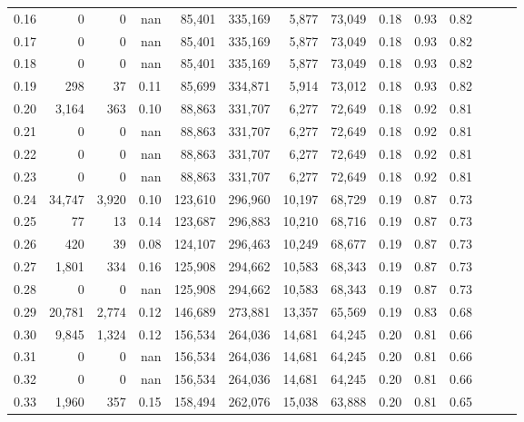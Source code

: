 \begin{tabular}{rrrrrrrrrrrrrr}
0.16 &       0 &      0 &   nan &   85,401 &  335,169 &   5,877 &  73,049 &  0.18 &  0.93 &      0.82 \\
0.17 &       0 &      0 &   nan &   85,401 &  335,169 &   5,877 &  73,049 &  0.18 &  0.93 &      0.82 \\
0.18 &       0 &      0 &   nan &   85,401 &  335,169 &   5,877 &  73,049 &  0.18 &  0.93 &      0.82 \\
0.19 &     298 &     37 &  0.11 &   85,699 &  334,871 &   5,914 &  73,012 &  0.18 &  0.93 &      0.82 \\
0.20 &   3,164 &    363 &  0.10 &   88,863 &  331,707 &   6,277 &  72,649 &  0.18 &  0.92 &      0.81 \\
0.21 &       0 &      0 &   nan &   88,863 &  331,707 &   6,277 &  72,649 &  0.18 &  0.92 &      0.81 \\
0.22 &       0 &      0 &   nan &   88,863 &  331,707 &   6,277 &  72,649 &  0.18 &  0.92 &      0.81 \\
0.23 &       0 &      0 &   nan &   88,863 &  331,707 &   6,277 &  72,649 &  0.18 &  0.92 &      0.81 \\
0.24 &  34,747 &  3,920 &  0.10 &  123,610 &  296,960 &  10,197 &  68,729 &  0.19 &  0.87 &      0.73 \\
0.25 &      77 &     13 &  0.14 &  123,687 &  296,883 &  10,210 &  68,716 &  0.19 &  0.87 &      0.73 \\
0.26 &     420 &     39 &  0.08 &  124,107 &  296,463 &  10,249 &  68,677 &  0.19 &  0.87 &      0.73 \\
0.27 &   1,801 &    334 &  0.16 &  125,908 &  294,662 &  10,583 &  68,343 &  0.19 &  0.87 &      0.73 \\
0.28 &       0 &      0 &   nan &  125,908 &  294,662 &  10,583 &  68,343 &  0.19 &  0.87 &      0.73 \\
0.29 &  20,781 &  2,774 &  0.12 &  146,689 &  273,881 &  13,357 &  65,569 &  0.19 &  0.83 &      0.68 \\
0.30 &   9,845 &  1,324 &  0.12 &  156,534 &  264,036 &  14,681 &  64,245 &  0.20 &  0.81 &      0.66 \\
0.31 &       0 &      0 &   nan &  156,534 &  264,036 &  14,681 &  64,245 &  0.20 &  0.81 &      0.66 \\
0.32 &       0 &      0 &   nan &  156,534 &  264,036 &  14,681 &  64,245 &  0.20 &  0.81 &      0.66 \\
0.33 &   1,960 &    357 &  0.15 &  158,494 &  262,076 &  15,038 &  63,888 &  0.20 &  0.81 &      0.65 \\

\end{tabular}
